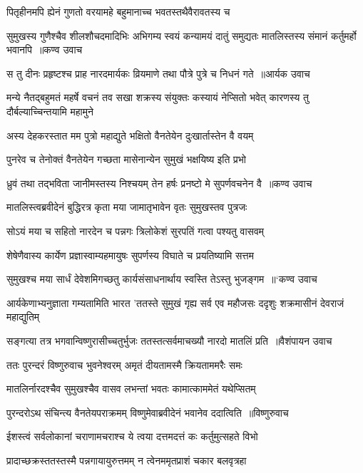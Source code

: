 \twolineshloka
{पितृहीनमपि ह्येनं गुणतो वरयामहे}
{बहुमानाच्च भवतस्तथैवैरावतस्य च}


\fourlineindentedshloka
{सुमुखस्य गुणैश्चैव शीलशौचदमादिभिः}
{अभिगम्य स्वयं कन्यामयं दातुं समुद्यतः}
{मातलिस्तस्य संमानं कर्तुमर्हो भवानपि ॥कण्व उवाच}
{}


\threelineshloka
{स तु दीनः प्रहृष्टश्च प्राह नारदमार्यकः}
{व्रियमाणे तथा पौत्रे पुत्रे च निधनं गते ॥आर्यक उवाच}
{}


\threelineshloka
{मन्ये नैतद्बहुमतं महर्षे वचनं तव}
{सखा शक्रस्य संयुक्तः कस्यायं नेप्सितो भवेत्}
{कारणस्य तु दौर्बल्याच्चिन्तयामि महामुने}


\twolineshloka
{अस्य देहकरस्तात मम पुत्रो महाद्युते}
{भक्षितो वैनतेयेन दुःखार्तास्तेन वै वयम्}


\twolineshloka
{पुनरेव च तेनोक्तं वैनतेयेन गच्छता}
{मासेनान्येन सुमुखं भक्षयिष्य इति प्रभो}


\threelineshloka
{ध्रुवं तथा तद्भविता जानीमस्तस्य निश्चयम्}
{तेन हर्षः प्रनष्टो मे सुपर्णवचनेन वै ॥कण्व उवाच}
{}


\twolineshloka
{मातलिस्त्वब्रवीदेनं बुद्धिरत्र कृता मया}
{जामातृभावेन वृतः सुमुखस्तव पुत्रजः}


\twolineshloka
{सोऽयं मया च सहितो नारदेन च पन्नगः}
{त्रिलोकेशं सुरपतिं गत्वा पश्यतु वासवम्}


\twolineshloka
{शेषेणैवास्य कार्येण प्रज्ञास्वाम्यहमायुषः}
{सुपर्णस्य विघाते च प्रयतिष्यामि सत्तम}


\threelineshloka
{सुमुखश्च मया सार्धं देवेशमिगच्छतु}
{कार्यसंसाधनार्थाय स्वस्ति तेऽस्तु भुजङ्गम ॥`कण्व उवाच}
{}


\threelineshloka
{आर्यकेणाभ्यनुज्ञाता गम्यतामिति भारत}
{'ततस्ते सुमुखं गृह्य सर्व एव महौजसः}
{ददृशुः शक्रमासीनं देवराजं महाद्युतिम्}


\threelineshloka
{सङ्गत्या तत्र भगवान्विष्णुरासीच्चतुर्भुजः}
{ततस्तत्सर्वमाचख्यौ नारदो मातलिं प्रति ॥वैशंपायन उवाच}
{}


\twolineshloka
{ततः पुरन्दरं विष्णुरुवाच भुवनेश्वरम्}
{अमृतं दीयतामस्मै क्रियताममरैः समः}


\twolineshloka
{मातलिर्नारदश्चैव सुमुखश्चैव वासव}
{लभन्तां भवतः कामात्काममेतं यथेप्सितम्}


\threelineshloka
{पुरन्दरोऽथ संचिन्त्य वैनतेयपराक्रमम्}
{विष्णुमेवाब्रवीदेनं भवानेव ददात्विति ॥विष्णुरुवाच}
{}


\twolineshloka
{ईशस्त्वं सर्वलोकानां चराणामचराश्च ये}
{त्वया दत्तमदत्तं कः कर्तुमुत्सहते विभो}


\twolineshloka
{प्रादाच्छक्रस्ततस्तस्मै पन्नगायायुरुत्तमम्}
{न त्वेनममृतप्राशं चकार बलवृत्रहा}


